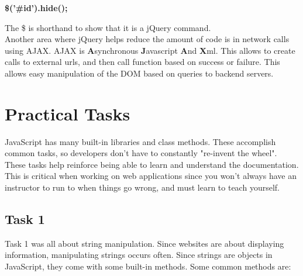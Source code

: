 \documentclass[portfolio.tex]{subfiles}
\begin{document}
				\begin{center}
					\textbf{\$('\#id').hide();}
				\end{center}
				 The \$ is shorthand to show that it is a jQuery command. \\

				Another area where jQuery helps reduce the amount of code is in network calls using AJAX. AJAX is \textbf{A}synchronous\textbf{ J}avascript \textbf{A}nd\textbf{ X}ml. This allows to create calls to external urls, and then call function based on success or failure. This allows easy manipulation of the DOM based on queries to backend servers.

		\section{Practical Tasks}

			JavaScript has many built-in libraries and class methods. These accomplish common tasks, so developers don't have to constantly "re-invent the wheel". \\

			\noindent These tasks help reinforce being able to learn and understand the documentation. This is critical when working on web applications since you won't always have an instructor to run to when things go wrong, and must learn to teach yourself.

			\subsection{Task 1}
				 Task 1 was all about string manipulation. Since websites are about displaying information, manipulating strings occurs often. Since strings are objects in JavaScript, they come with some built-in methods. Some common methods are:\\
\end{document}
